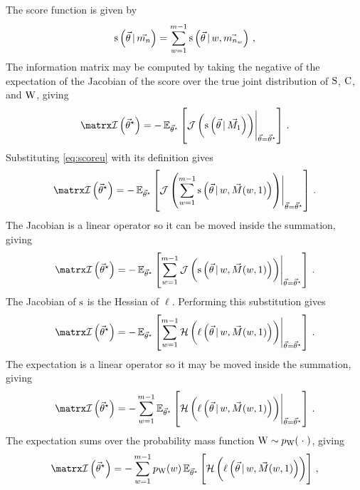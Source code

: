 \documentclass[../main.tex]{subfiles}
\begin{document}
The score function is given by
\begin{equation}
\label{eq:scoreu}
    \operatorname{\rm{s}}\left(\vec{\theta} {\,|\,} \vec{m_n}\right) = \sum_{w=1}^{m-1} \operatorname{\rm{s}}\left(\vec{\theta} {\,|\,} w, \vec{m_{n_w}}\right)\,,
\end{equation}
The information matrix may be computed by taking the negative of the expectation of the Jacobian of the score over the true joint distribution of $\mathrm{S}$, $\mathrm{C}$, and $\mathrm{W}$, giving
\begin{equation}
    \infomatrx\left(\tparam\sysparamvec\right) = -\expectation_{\tparam\sysparamvec}\left[\eval{\jacobian\left(\score\left(\sysparamvec \given \mfsn{1}\right)\right)}_{\sysparamvec=\tparam\sysparamvec}\right]\,.
\end{equation}
Substituting \cref{eq:scoreu} with its definition gives
\begin{equation}
    \infomatrx\left(\tparam\sysparamvec\right) = -\expectation_{\tparam\sysparamvec}\left[\eval{\jacobian\left(\sum_{w=1}^{m-1} \score\left(\sysparamvec \given w, \mfsi{1}\right)\right)}_{\sysparamvec = \tparam\sysparamvec}\right]\,.
\end{equation}
The Jacobian is a linear operator so it can be moved inside the summation, giving
\begin{equation}
    \infomatrx\left(\tparam\sysparamvec\right) = 
    -\expectation_{\tparam\sysparamvec}\left[\sum_{w=1}^{m-1} \eval{\jacobian\left(\score\left(\sysparamvec \given w, \mfsi{1}\right)\right)}_{\sysparamvec=\tparam\sysparamvec}\right]\,.
\end{equation}
The Jacobian of $\operatorname{\rm{s}}$ is the Hessian of $\ell$. Performing this substitution gives
\begin{equation}
    \infomatrx\left(\tparam\sysparamvec\right) = -\expectation_{\tparam\sysparamvec}\left[\sum_{w=1}^{m-1} \eval{\hessian\left(\ell\left(\sysparamvec \given w, \mfsi{1}\right)\right)}_{\sysparamvec=\tparam\sysparamvec}\right]\,.
\end{equation}
The expectation is a linear operator so it may be moved inside the summation, giving
\begin{equation}
    \infomatrx\left(\tparam\sysparamvec\right) = -\sum_{w=1}^{m-1} \expectation_{\tparam\sysparamvec}\left[\eval{\hessian\left(\ell\left(\sysparamvec \given w, \mfsi{1}\right)\right)}_{\sysparamvec=\tparam\sysparamvec}\right]\,.
\end{equation}
The expectation sums over the probability mass function $\mathrm{W} \sim p_{\mathrm{W}}(\;\cdot\;)$, giving
\begin{equation}
    \infomatrx\left(\tparam\sysparamvec\right)
        = -\sum_{w=1}^{m-1} \pmf_{\RV{W}}(w) \expectation_{\tparam\sysparamvec}\left[\hessian\left(\ell\left(\sysparamvec \given w, \mfsi{1}\right)\right)\right]\,,
\end{equation}
\end{document}
